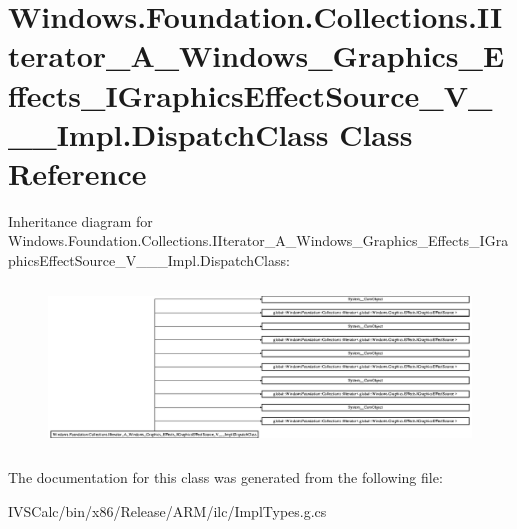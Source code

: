 \hypertarget{class_windows_1_1_foundation_1_1_collections_1_1_i_iterator___a___windows___graphics___effects__8228c62fa664063920998b68b9c75c20}{}\section{Windows.\+Foundation.\+Collections.\+I\+Iterator\+\_\+\+A\+\_\+\+Windows\+\_\+\+Graphics\+\_\+\+Effects\+\_\+\+I\+Graphics\+Effect\+Source\+\_\+\+V\+\_\+\+\_\+\+\_\+\+Impl.\+Dispatch\+Class Class Reference}
\label{class_windows_1_1_foundation_1_1_collections_1_1_i_iterator___a___windows___graphics___effects__8228c62fa664063920998b68b9c75c20}
Inheritance diagram for Windows.\+Foundation.\+Collections.\+I\+Iterator\+\_\+\+A\+\_\+\+Windows\+\_\+\+Graphics\+\_\+\+Effects\+\_\+\+I\+Graphics\+Effect\+Source\+\_\+\+V\+\_\+\+\_\+\+\_\+\+Impl.\+Dispatch\+Class\+:\begin{figure}[H]
\begin{center}
\leavevmode
\includegraphics[height=4.368794cm]{class_windows_1_1_foundation_1_1_collections_1_1_i_iterator___a___windows___graphics___effects__8228c62fa664063920998b68b9c75c20}
\end{center}
\end{figure}


The documentation for this class was generated from the following file\+:\begin{DoxyCompactItemize}
\item 
I\+V\+S\+Calc/bin/x86/\+Release/\+A\+R\+M/ilc/Impl\+Types.\+g.\+cs\end{DoxyCompactItemize}
